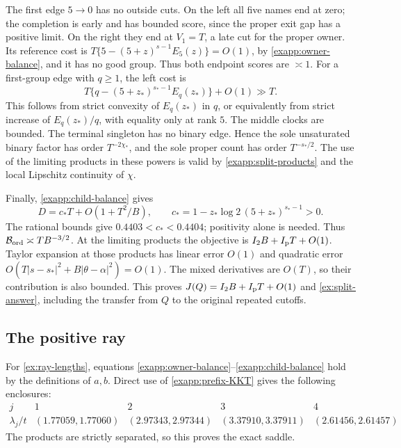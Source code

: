 The first edge \(5\to0\) has no outside cuts.  On the left all five
names end at zero; the completion is early and has bounded score,
since the proper exit gap has a positive limit.  On the right they end
at \(V_1=T\), a late cut for the proper owner.  Its reference cost is
\(T\{5-(5+z)^{s-1}E_5(z)\}=O(1)\), by
\eqref{exapp:owner-balance}, and it has no good group.  Thus both
endpoint scores are \(\asymp1\).
For a first-group edge with \(q\ge1\), the left cost is
\[
 T\{q-(5+z_*)^{s_*-1}E_q(z_*)\}+O(1)\gg T.
\]
This follows from strict convexity of \(E_q(z_*)\) in \(q\), or
equivalently from strict increase of \(E_q(z_*)/q\), with equality
only at rank \(5\).  The middle clocks are bounded.  The terminal
singleton has no binary edge.  Hence the sole unsaturated binary
factor has order \(T^{-2\chi_*}\), and the sole proper count has
order \(T^{-s_*/2}\).  The use of the limiting products in these
powers is valid by \eqref{exapp:split-products} and the local
Lipschitz continuity of \(\chi\).

Finally, \eqref{exapp:child-balance} gives
\[
 D=c_*T+O(1+T^2/B),\qquad
 c_*=1-z_*\log2\,(5+z_*)^{s_*-1}>0.
\]
The rational bounds give \(0.4403<c_*<0.4404\); positivity alone
is needed.  Thus
\(\mathcal B_{\rm ord}\asymp T B^{-3/2}\).
At the limiting products the objective is
\(I_2B+I_{\rm p}T+O(1)\).  Taylor expansion at those products has
linear error \(O(1)\) and quadratic error
\(O(T\lvert s-s_*\rvert^2+B\lvert\theta-\alpha\rvert^2)=O(1)\).
The mixed derivatives are \(O(T)\), so their contribution is also
bounded.  This proves \(J(Q)=I_2B+I_{\rm p}T+O(1)\) and
\eqref{ex:split-answer}, including the transfer from \(Q\) to the
original repeated cutoffs.

\subsection{The positive ray}

For \eqref{ex:ray-lengths}, equations
\eqref{exapp:owner-balance}--\eqref{exapp:child-balance} hold by
the definitions of \(a,b\).  Direct use of
\eqref{exapp:prefix-KKT} gives the following enclosures:
\[
 \begin{array}{c|cccc}
 j&1&2&3&4\\ \hline
 \lambda_j/t&(1.77059,1.77060)&(2.97343,2.97344)&
 (3.37910,3.37911)&(2.61456,2.61457)
 \end{array}
\]
The products are strictly separated, so this proves the exact saddle.

